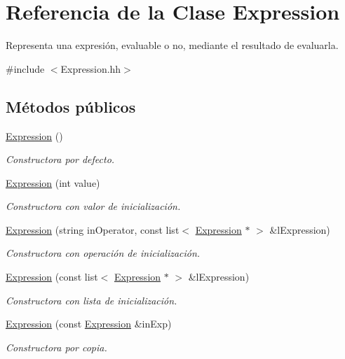 \hypertarget{class_expression}{}\section{Referencia de la Clase Expression}
\label{class_expression}


Representa una expresión, evaluable o no, mediante el resultado de evaluarla.  




{\ttfamily \#include $<$Expression.\+hh$>$}

\subsection*{Métodos públicos}
\begin{DoxyCompactItemize}
\item 
\hyperlink{class_expression_afcf87716bf0abfe8d414c92529e1564a}{Expression} ()
\begin{DoxyCompactList}\small\item\em Constructora por defecto. \end{DoxyCompactList}\item 
\hyperlink{class_expression_af3585b12f597cad047c2939dcceb41bc}{Expression} (int value)
\begin{DoxyCompactList}\small\item\em Constructora con valor de inicialización. \end{DoxyCompactList}\item 
\hyperlink{class_expression_a7de929ee2b5020ee2b3d50e0e959340f}{Expression} (string in\+Operator, const list$<$ \hyperlink{class_expression}{Expression} $\ast$ $>$ \&l\+Expression)
\begin{DoxyCompactList}\small\item\em Constructora con operación de inicialización. \end{DoxyCompactList}\item 
\hyperlink{class_expression_aefc4947a77277148ad0dc79506ac8e79}{Expression} (const list$<$ \hyperlink{class_expression}{Expression} $\ast$ $>$ \&l\+Expression)
\begin{DoxyCompactList}\small\item\em Constructora con lista de inicialización. \end{DoxyCompactList}\item 
\hyperlink{class_expression_ae84af9ba2a88741d6f65a70ef8869faf}{Expression} (const \hyperlink{class_expression}{Expression} \&in\+Exp)
\begin{DoxyCompactList}\small\item\em Constructora por copia. \end{DoxyCompactList}\item 

\end{DoxyCompactItemize}
